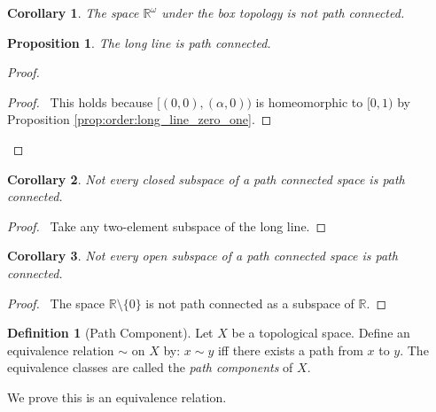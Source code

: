 \documentclass{report}
\let\qed\relax
\newtheorem{prop}[lm]{Proposition}
\newtheorem{cor}{Corollary}[lm]
\theoremstyle{definition}
\newtheorem{df}[lm]{Definition}
\begin{document}
 \begin{cor}
   The space $\mathbb{R}^\omega$ under the box topology is not path connected.
 \end{cor}

  \begin{prop}
    The long line is path connected.
  \end{prop}

  \begin{proof}
    \pf
    \begin{proof}
      \pf\ This holds because $[(0, 0), (\alpha, 0))$ is homeomorphic to $[0,
      1)$ by Proposition \ref{prop:order:long_line_zero_one}.
    \end{proof}
    \qed
  \end{proof}

\begin{cor}
  Not every closed subspace of a path connected space is path connected.
\end{cor}

\begin{proof}
  \pf\ Take any two-element subspace of the long line.
\end{proof}

\begin{cor}
  Not every open subspace of a path connected space is path connected.
\end{cor}

\begin{proof}
  \pf\ The space $\mathbb{R} \setminus \{ 0 \}$ is not path connected as a subspace of $\mathbb{R}$. \qed
\end{proof}

  \begin{df}[Path Component]
    Let $X$ be a topological space. Define an equivalence relation $\sim$ on
    $X$
    by: $x \sim y$ iff there exists a path from $x$ to $y$. The equivalence
    classes  are called the \emph{path components} of $X$.

    We prove this is an equivalence relation.
  \end{df}
\end{document}
